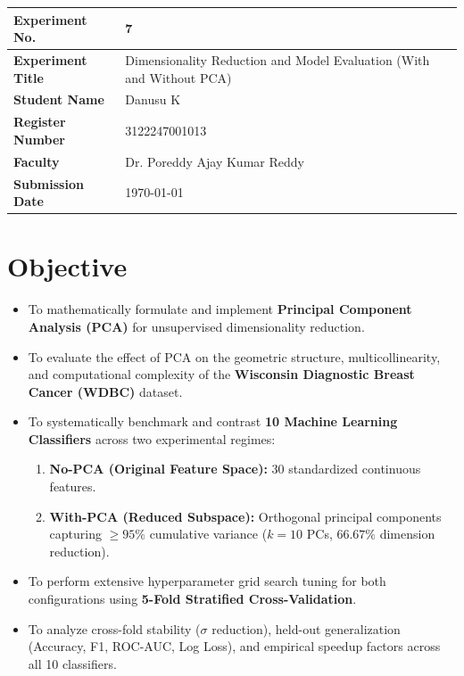 \documentclass[12pt,a4paper]{article}
\begin{document}
\noindent
\begin{tabular}{|p{3.8cm}|p{11.2cm}|}
\hline
\textbf{Experiment No.} & 7 \\ \hline
\textbf{Experiment Title} & Dimensionality Reduction and Model Evaluation (With and Without PCA)\footnotemark \\ \hline
\textbf{Student Name} & Danusu K \\ \hline
\textbf{Register Number} & 3122247001013 \\ \hline
\textbf{Faculty} & Dr. Poreddy Ajay Kumar Reddy \\ \hline
\textbf{Submission Date} & \today \\ \hline
\end{tabular}

\section{Objective}
\begin{itemize}
\item To mathematically formulate and implement \textbf{Principal Component Analysis (PCA)} for unsupervised dimensionality reduction.
\item To evaluate the effect of PCA on the geometric structure, multicollinearity, and computational complexity of the \textbf{Wisconsin Diagnostic Breast Cancer (WDBC)} dataset.
\item To systematically benchmark and contrast \textbf{10 Machine Learning Classifiers} across two experimental regimes:
\begin{enumerate}[label=(\alph*)]
\item \textbf{No-PCA (Original Feature Space):} 30 standardized continuous features.
\item \textbf{With-PCA (Reduced Subspace):} Orthogonal principal components capturing $\ge 95\%$ cumulative variance ($k=10$ PCs, $66.67\%$ dimension reduction).
\end{enumerate}
\item To perform extensive hyperparameter grid search tuning for both configurations using \textbf{5-Fold Stratified Cross-Validation}.
\item To analyze cross-fold stability ($\sigma$ reduction), held-out generalization (Accuracy, F1, ROC-AUC, Log Loss), and empirical speedup factors across all 10 classifiers.
\end{itemize}
\end{document}
